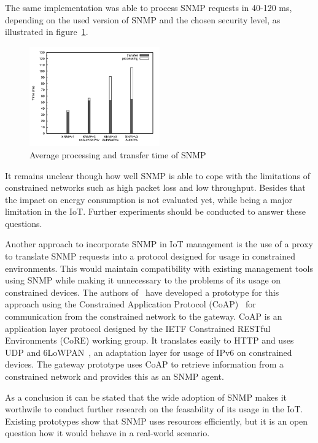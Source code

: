 \documentclass[conference]{IEEEtran}
\begin{document}
The same implementation was able to process SNMP requests in 40-120 ms, depending on the used version of SNMP and the chosen security level, as illustrated in figure~\ref{fig:snmp-processing-time}. 

\begin{figure}[h]
  \begin{center}
    \includegraphics[width=0.5\textwidth]{snmp-processing-time}
  \end{center}
  \caption{Average processing and transfer time of SNMP~\cite{mgmt-constrained-iot}}
  \label{fig:snmp-processing-time}
\end{figure}

It remains unclear though how well SNMP is able to cope with the limitations of constrained networks such as high packet loss and low throughput. Besides that the impact on energy consumption is not evaluated yet, while being a major limitation in the IoT. Further experiments should be conducted to answer these questions.

Another approach to incorporate SNMP in IoT management is the use of a proxy to translate SNMP requests into a protocol designed for usage in constrained environments. This would maintain compatibility with existing management tools using SNMP while making it unnecessary to the problems of its usage on constrained devices. The authors of~\cite{Lindholm-Ventola2014} have developed a prototype for this approach using the Constrained Application Protocol (CoAP)~\cite{draft-ietf-core-coap-18} for communication from the constrained network to the gateway. CoAP is an application layer protocol designed by the IETF Constrained RESTful Environments (CoRE) working group. It translates easily to HTTP and uses UDP and 6LoWPAN~\cite{rfc4919}, an adaptation layer for usage of IPv6 on constrained devices. The gateway prototype uses CoAP to retrieve information from a constrained network and provides this as an SNMP agent.

As a conclusion it can be stated that the wide adoption of SNMP makes it worthwile to conduct further research on the feasability of its usage in the IoT. Existing prototypes show that SNMP uses resources efficiently, but it is an open question how it would behave in a real-world scenario.
\end{document}
